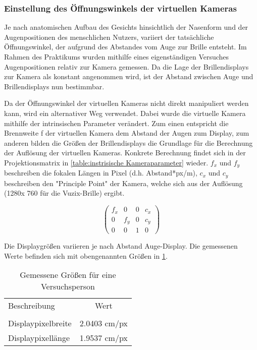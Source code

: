 \subsubsection{Einstellung des Öffnungswinkels der virtuellen Kameras}

Je nach anatomischen Aufbau des Gesichts hinsichtlich  der Nasenform und der Augenpositionen des menschlichen Nutzers, variiert der tatsächliche Öffnungswinkel, der aufgrund des Abstandes vom Auge zur Brille entsteht. Im Rahmen des Praktikums wurden mithilfe eines eigenständigen Versuches Augenpositionen relativ zur Kamera gemessen. Da die Lage der Brillendisplays zur Kamera als konstant angenommen wird, ist der Abstand zwischen Auge und Brillendisplays nun bestimmbar.

Da der Öffnungswinkel der virtuellen Kameras nicht direkt manipuliert werden kann, wird ein alternativer Weg verwendet. Dabei wurde die virtuelle Kamera mithilfe der intrinsischen Parameter verändert. Zum einen entspricht die Brennweite f der virtuellen Kamera dem Abstand der Augen zum Display, zum anderen bilden die Größen der Brillendisplays die Grundlage für die Berechnung der Auflösung der virtuellen Kameras. Konkrete Berechnung findet sich in der Projektionsmatrix in \ref{table:instrisische Kameraparameter} wieder. $f_x$ und $f_y$ beschreiben die fokalen Längen in Pixel (d.h. Abstand*px/m), $c_x$ und $c_y$ beschreiben den "Principle Point" der Kamera, welche sich aus der Auflösung (1280x 760 für die Vuzix-Brille) ergibt. 

%

\begin{equation}
\begin{pmatrix}
f_x & 0& 0& c_x \\
0 & f_y & 0 & c_y\\ 
0 & 0&   1 & 0  
\end{pmatrix}
\label{table:instrisische Kameraparameter}
\end{equation}

Die Displaygrößen variieren je nach Abstand Auge-Display. Die gemessenen Werte befinden sich mit obengenannten Größen in \ref{table:Messwerte DisplayAuge}.
%
 \begin{table}[ht]

 \begin{tabular}{lc} 
  Beschreibung & Wert \\ \\
  Displaypixelbreite & 2.0403 cm/px \\
  Displaypixellänge &  1.9537 cm/px \\
 \end{tabular}
 \caption{Gemessene Größen für eine Versuchsperson}
 \label{table:Messwerte DisplayAuge}
 \end{table}



